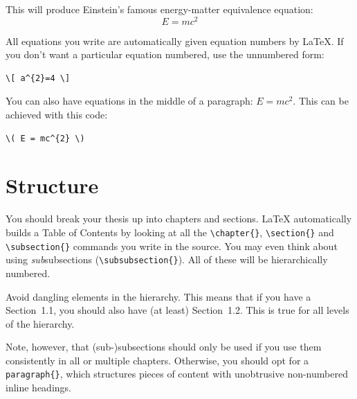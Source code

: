 This will produce Einstein's famous energy-matter equivalence equation:
\begin{equation}
E = mc^{2}
\label{eqn:Einstein}
\end{equation}

All equations you write are automatically given equation numbers by LaTeX. If you don't want a particular equation numbered, use the unnumbered form:

\begin{lstlisting}[language={[LaTeX]TeX}]
\[ a^{2}=4 \]
\end{lstlisting}

You can also have equations in the middle of a paragraph: \( E = mc^{2} \). This can be achieved with this code: 

\begin{lstlisting}[language={[LaTeX]TeX}]
\( E = mc^{2} \)
\end{lstlisting}


\section{Structure}

You should break your thesis up into chapters and sections. LaTeX automatically builds a Table of Contents by looking at all the \verb|\chapter{}|, \verb|\section{}|  and \verb|\subsection{}| commands you write in the source. You may even think about using \emph{sub}subsections (\verb|\subsubsection{}|). All of these will be hierarchically numbered.

Avoid dangling elements in the hierarchy. This means that if you have a Section~1.1, you should also have (at least) Section~1.2. This is true for all levels of the hierarchy.

Note, however, that (sub-)subsections should only be used if you use them consistently in all or multiple chapters. Otherwise, you should opt for a \verb|paragraph{}|, which structures pieces of content with unobtrusive non-numbered inline headings.

